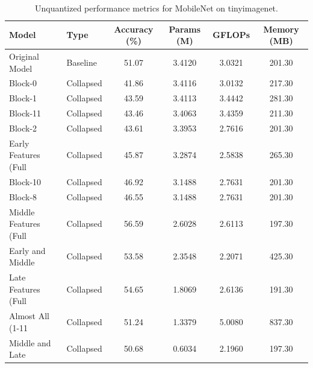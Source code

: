 \begin{table}
\caption{Unquantized performance metrics for MobileNet on tinyimagenet.}
\label{tab:MobileNet_tinyimagenet_unquant}
\begin{tabular}{llcccc}
\toprule
Model & Type & Accuracy (\%) & Params (M) & GFLOPs & Memory (MB) \\
\midrule
Original Model & Baseline & 51.07 & 3.4120 & 3.0321 & 201.30 \\
Block-0 & Collapsed & 41.86 & 3.4116 & 3.0132 & 217.30 \\
Block-1 & Collapsed & 43.59 & 3.4113 & 3.4442 & 281.30 \\
Block-11 & Collapsed & 43.46 & 3.4063 & 3.4359 & 211.30 \\
Block-2 & Collapsed & 43.61 & 3.3953 & 2.7616 & 201.30 \\
Early Features (Full & Collapsed & 45.87 & 3.2874 & 2.5838 & 265.30 \\
Block-10 & Collapsed & 46.92 & 3.1488 & 2.7631 & 201.30 \\
Block-8 & Collapsed & 46.55 & 3.1488 & 2.7631 & 201.30 \\
Middle Features (Full & Collapsed & 56.59 & 2.6028 & 2.6113 & 197.30 \\
Early and Middle & Collapsed & 53.58 & 2.3548 & 2.2071 & 425.30 \\
Late Features (Full & Collapsed & 54.65 & 1.8069 & 2.6136 & 191.30 \\
Almost All (1-11 & Collapsed & 51.24 & 1.3379 & 5.0080 & 837.30 \\
Middle and Late & Collapsed & 50.68 & 0.6034 & 2.1960 & 197.30 \\
\bottomrule
\end{tabular}
\end{table}

